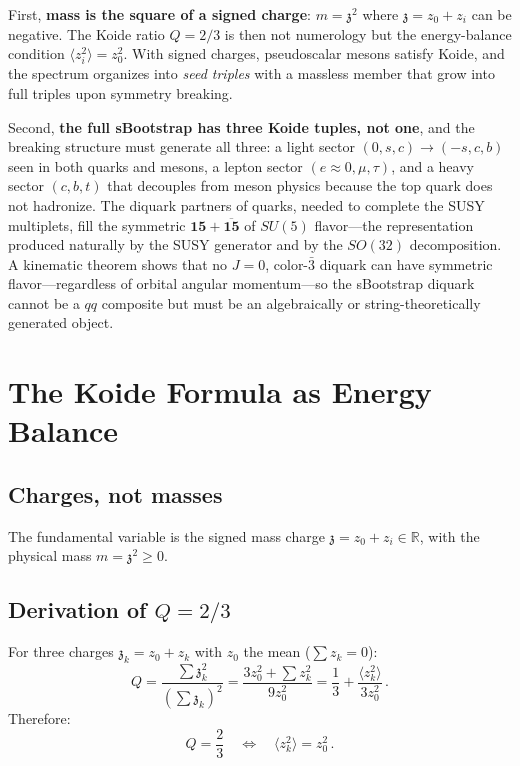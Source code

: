 \documentclass[12pt,a4paper]{article}
\newcommand{\zch}{\mathfrak{z}}
\begin{document}
First, \textbf{mass is the square of a signed charge}: $m = \zch^2$ 
where $\zch = z_0 + z_i$ can be negative. The Koide ratio $Q = 2/3$ 
is then not numerology but the energy-balance condition 
$\langle z_i^2\rangle = z_0^2$. With signed charges, pseudoscalar 
mesons satisfy Koide, and the spectrum organizes into \emph{seed 
triples} with a massless member that grow into full triples upon 
symmetry breaking.

Second, \textbf{the full sBootstrap has three Koide tuples, not one}, 
and the breaking structure must generate all three: a light sector 
$(0,s,c) \to (-s,c,b)$ seen in both quarks and mesons, a lepton 
sector $(e\!\approx\!0, \mu, \tau)$, and a heavy sector $(c,b,t)$ 
that decouples from meson physics because the top quark does not 
hadronize. The diquark partners of quarks, needed to complete the 
SUSY multiplets, fill the symmetric $\mathbf{15} + \overline{\mathbf{15}}$ 
of $SU(5)$ flavor---the representation produced naturally by the 
SUSY generator and by the $SO(32)$ decomposition. A kinematic 
theorem shows that no $J=0$, color-$\bar{3}$ diquark can have 
symmetric flavor---regardless of orbital angular momentum---so the 
sBootstrap diquark cannot be a $qq$ composite but must be an 
algebraically or string-theoretically generated object.

\section{The Koide Formula as Energy Balance}
\label{sec:koide_algebra}

\subsection{Charges, not masses}

The fundamental variable is the signed mass charge $\zch = z_0 + z_i 
\in \mathbb{R}$, with the physical mass $m = \zch^2 \geq 0$.

\subsection{Derivation of $Q = 2/3$}

For three charges $\zch_k = z_0 + z_k$ with $z_0$ the mean 
($\sum z_k = 0$):
\begin{equation}
Q = \frac{\sum \zch_k^2}{(\sum \zch_k)^2} 
= \frac{3z_0^2 + \sum z_k^2}{9z_0^2}
= \frac{1}{3} + \frac{\langle z_k^2\rangle}{3z_0^2}\,.
\end{equation}
Therefore:
\begin{equation}
\boxed{Q = \frac{2}{3} \quad\Longleftrightarrow\quad 
\langle z_k^2\rangle = z_0^2\,.}
\end{equation}
\end{document}
